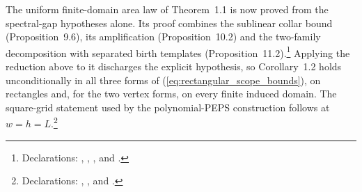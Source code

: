 \documentclass{article}
\begin{document}
The uniform finite-domain area law of Theorem~1.1 is now proved from the
spectral-gap hypotheses alone. Its proof combines the sublinear collar bound
(Proposition~9.6), its amplification (Proposition~10.2) and the two-family
decomposition with separated birth templates
(Proposition~11.2).\footnote{Declarations:
,
,
, and
.}
Applying the reduction above to it discharges the explicit hypothesis, so
Corollary~1.2 holds unconditionally in all three forms of
(\ref{eq:rectangular_scope_bounds}), on rectangles and, for the two vertex
forms, on every finite induced domain. The square-grid statement used by the
polynomial-PEPS construction follows at $w=h=L$.\footnote{Declarations:
,
, and
.}



\end{document}
